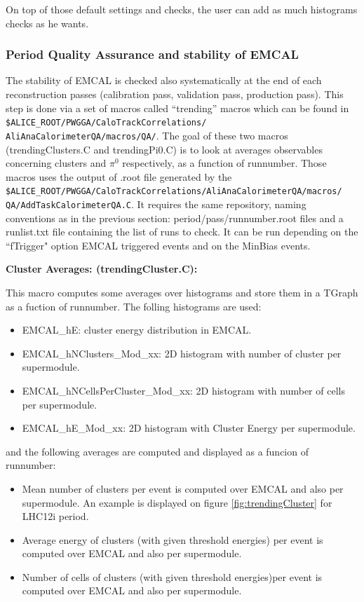 On top of those default settings and checks, the user can add as much histograms checks as he wants.

\subsubsection{Period Quality Assurance and stability of EMCAL}

The stability of EMCAL is checked also systematically at the end of each reconstruction passes (calibration pass, validation pass, production pass).
This step is done via a set of macros called ``trending'' macros which can be found in  \texttt{\$ALICE\_ROOT/PWGGA/CaloTrackCorrelations/\\ AliAnaCalorimeterQA/macros/QA/}. The goal of these two  macros (trendingClusters.C and trendingPi0.C) is to look at averages observables concerning clusters and $\pi^0$ respectively, as a function of runnumber.
Those macros uses the output of  .root file generated by the\\ \texttt{\$ALICE\_ROOT/PWGGA/CaloTrackCorrelations/AliAnaCalorimeterQA/macros/ \\ QA/AddTaskCalorimeterQA.C}.
It requires the same repository, naming conventions as in the previous section: period/pass/runnumber.root files and a runlist.txt file containing the list of runs to check. It can be run depending on the ``fTrigger" option  EMCAL triggered events and on the MinBias events.

{\bf Cluster Averages: (trendingCluster.C):}

This macro computes some averages over histograms and store them in a TGraph as a fuction of runnumber.
The folling histograms are used:
\begin{itemize}
\item EMCAL\_hE: cluster energy distribution in EMCAL.
\item EMCAL\_hNClusters\_Mod\_xx: 2D histogram with number of cluster per supermodule.
\item EMCAL\_hNCellsPerCluster\_Mod\_xx: 2D histogram with number of cells per supermodule.
\item EMCAL\_hE\_Mod\_xx: 2D histogram with Cluster Energy per supermodule.
\end{itemize}


and the following averages are computed and displayed as a funcion of runnumber:

\begin{itemize}
\item Mean number of clusters per event is computed  over EMCAL and also per supermodule. An example is displayed on figure \ref{fig:trendingCluster} for LHC12i period. 
\item Average energy of clusters (with given threshold energies) per event is computed over EMCAL and also per supermodule.
\item Number of cells of clusters (with given threshold energies)per event is computed over EMCAL and also per supermodule.
\end{itemize}


